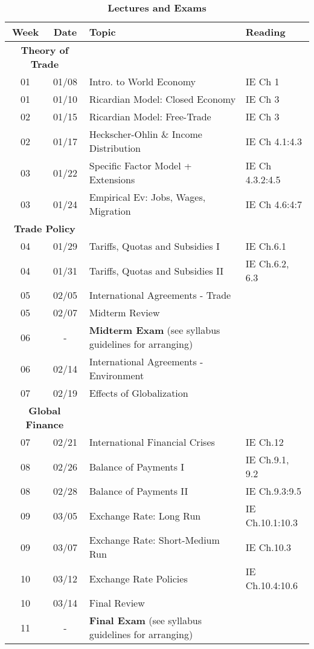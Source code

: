 \documentclass[10pt]{article}
\newcommand{\ra}[1]{\renewcommand{\arraystretch}{#1}}
\begin{document}
\begin{table}[h!]
	\caption*{\large\textbf{Lectures and Exams}}
	\centering
	\ra{1.5}
	\begin{tabular}{@{\extracolsep{0.5cm}} c c l l @{}}
		\toprule
		\textbf{Week} & \textbf{Date} & \textbf{Topic} & \textbf{Reading}  \\ \toprule
		 \multicolumn{2}{c}{\textbf{Theory of Trade}} & & \\
		01 & 01/08 & Intro. to World Economy & IE Ch 1 \\
		01 & 01/10 & Ricardian Model: Closed Economy & IE Ch 3 \\
		02 & 01/15 & Ricardian Model: Free-Trade & IE Ch 3 \\
		02 & 01/17 & Heckscher-Ohlin \& Income Distribution & IE Ch 4.1:4.3 \\
		03 & 01/22 & Specific Factor Model + Extensions & IE Ch 4.3.2:4.5  \\
		03 & 01/24 & Empirical Ev: Jobs, Wages, Migration  & IE Ch 4.6:4:7  \\ 
		\multicolumn{2}{c}{\textbf{Trade Policy}} & & \\
		04 & 01/29 & Tariffs, Quotas and Subsidies I & IE Ch.6.1\\ 
		04 & 01/31 & Tariffs, Quotas and Subsidies II & IE Ch.6.2, 6.3  \\
		05 & 02/05 & International Agreements - Trade &  \\
		05 & 02/07 & Midterm Review & \\ \midrule 
		06 & - & \textbf{Midterm Exam} (see syllabus guidelines for arranging) & \\ \midrule
		06 & 02/14 & International Agreements - Environment &   \\
		07 & 02/19 & Effects of Globalization  &   \\
		\multicolumn{2}{c}{\textbf{Global Finance}} & & \\
		07 & 02/21 & International Financial Crises &  IE Ch.12  \\ 
		08 & 02/26 & Balance of Payments I & IE Ch.9.1, 9.2  \\ 
		08 & 02/28 & Balance of Payments II & IE Ch.9.3:9.5 \\
		09 & 03/05 & Exchange Rate: Long Run & IE Ch.10.1:10.3  \\
		09 & 03/07 & Exchange Rate: Short-Medium Run & IE Ch.10.3   \\
		10 & 03/12 & Exchange Rate Policies & IE Ch.10.4:10.6 \\ 
		10 & 03/14 & Final Review &   \\  \midrule
		11 & - & \textbf{Final Exam} (see syllabus guidelines for arranging) & \\
		\bottomrule
	\end{tabular}
\end{table}
\end{document}
